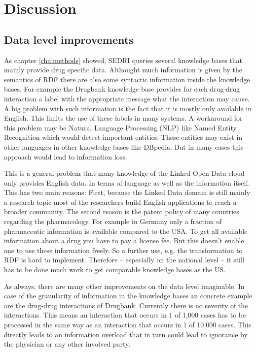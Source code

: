 
\chapter{Discussion}
\label{cha:discussion}

\section*{Data level improvements}
\label{sec:impr-data-level}

As chapter \ref{cha:methods} showed, SEDRI queries several knowledge bases that mainly provide drug specific data.
Althought much information is given by the semantics of RDF there are also some syntactic information inside the knowledge bases.
For example the Drugbank knowledge base provides for each drug-drug interaction a label with the appropriate message what the interaction may cause.
A big problem with such information is the fact that it is mostly only available in English.
This limits the use of these labels in many systems.
A workaround for this problem may be Natural Language Processing (NLP) like Named Entity Recognition which would detect important entities.
These entities may exist in other languages in other knowledge bases like DBpedia.
But in many cases this approach would lead to information loss.

This is a general problem that many knowledge of the Linked Open Data cloud only provides English data.
In terms of language as well as the information itself.
This has two main reasons:
First, because the Linked Data domain is still mainly a research topic most of the researchers build English applications to reach a broader community.
The second reason is the patent policy of many countries regarding the pharmacology.
For example in Germany only a fraction of pharmaceutic information is available compared to the USA.
To get all available information about a drug you have to pay a license fee.
But this doesn't enable one to use these information freely.
So a further use, e.g. the transformation to RDF is hard to implement.
Therefore -- especially on the national level -- it still has to be done much work to get comparable knowledge bases as the US.

As always, there are many other improvements on the data level imaginable.
In case of the  granularity of information in the knowledge bases an concrete example are the drug-drug interactions of Drugbank.
Currently there is no severity of the interactions.
This means an interaction that occurs in 1 of 1,000 cases has to be processed in the same way as an interaction that occurs in 1 of 10,000 cases.
This directly leads to an information overload that in turn could lead to ignorance by the physician or any other involved party.

